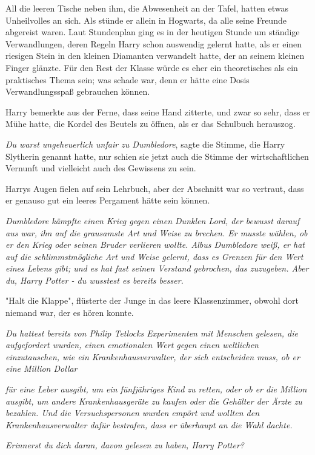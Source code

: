 {All die leeren Tische neben ihm, die Abwesenheit an der Tafel, hatten etwas Unheilvolles an sich. Als stünde er allein in Hogwarts, da alle seine Freunde abgereist waren. Laut Stundenplan ging es in der heutigen Stunde um ständige Verwandlungen, deren Regeln Harry schon auswendig gelernt hatte, als er einen riesigen Stein in den kleinen Diamanten verwandelt hatte, der an seinem kleinen Finger glänzte. Für den Rest der Klasse würde es eher ein theoretisches als ein praktisches Thema sein; was schade war, denn er hätte eine Dosis Verwandlungsspaß gebrauchen können.

Harry bemerkte aus der Ferne, dass seine Hand zitterte, und zwar so sehr, dass er Mühe hatte, die Kordel des Beutels zu öffnen, als er das Schulbuch herauszog.

\emph{Du warst ungeheuerlich unfair zu Dumbledore}, sagte die Stimme, die Harry Slytherin genannt hatte, nur schien sie jetzt auch die Stimme der wirtschaftlichen Vernunft und vielleicht auch des Gewissens zu sein.

Harrys Augen fielen auf sein Lehrbuch, aber der Abschnitt war so vertraut, dass er genauso gut ein leeres Pergament hätte sein können.

\emph{Dumbledore kämpfte einen Krieg gegen einen Dunklen Lord, der bewusst darauf aus war, ihn auf die grausamste Art und Weise zu brechen. Er musste wählen, ob er den Krieg oder seinen Bruder verlieren wollte. Albus Dumbledore weiß, er hat auf die schlimmstmögliche Art und Weise gelernt, dass es Grenzen für den Wert eines Lebens gibt; und es hat fast seinen Verstand gebrochen, das zuzugeben. Aber du, Harry Potter - du wusstest es bereits besser.}

"Halt die Klappe", flüsterte der Junge in das leere Klassenzimmer, obwohl dort niemand war, der es hören konnte.

\emph{Du hattest bereits von Philip Tetlocks Experimenten mit Menschen gelesen, die aufgefordert wurden, einen emotionalen Wert gegen einen weltlichen einzutauschen, wie ein Krankenhausverwalter, der sich entscheiden muss, ob er eine Million Dollar}

\emph{für eine Leber ausgibt, um ein fünfjähriges Kind zu retten, oder ob er die Million ausgibt, um andere Krankenhausgeräte zu kaufen oder die Gehälter der Ärzte zu bezahlen. Und die Versuchspersonen wurden empört und wollten den Krankenhausverwalter dafür bestrafen, dass er überhaupt an die Wahl dachte.}

\emph{Erinnerst du dich daran, davon gelesen zu haben, Harry Potter?}

}
